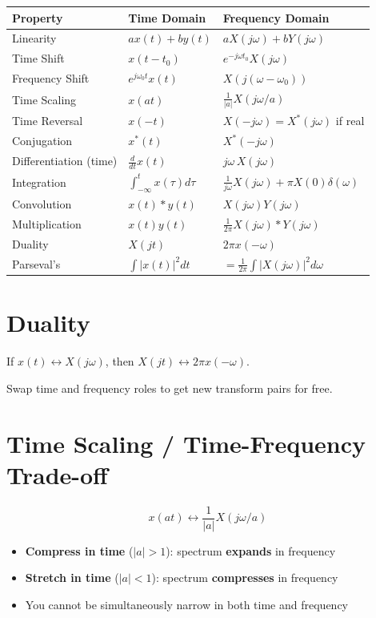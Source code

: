 \documentclass[11pt]{article}
\begin{document}
\begin{center}
\begin{tabular}{|l|l|l|}
\hline
\textbf{Property} & \textbf{Time Domain} & \textbf{Frequency Domain} \\
\hline
Linearity & $ax(t) + by(t)$ & $aX(j\omega) + bY(j\omega)$ \\
\hline
Time Shift & $x(t - t_0)$ & $e^{-j\omega t_0} X(j\omega)$ \\
\hline
Frequency Shift & $e^{j\omega_0 t} x(t)$ & $X(j(\omega - \omega_0))$ \\
\hline
Time Scaling & $x(at)$ & $\frac{1}{|a|} X(j\omega/a)$ \\
\hline
Time Reversal & $x(-t)$ & $X(-j\omega) = X^*(j\omega)$ if real \\
\hline
Conjugation & $x^*(t)$ & $X^*(-j\omega)$ \\
\hline
Differentiation (time) & $\frac{d}{dt}x(t)$ & $j\omega \, X(j\omega)$ \\
\hline
Integration & $\int_{-\infty}^{t} x(\tau)d\tau$ & $\frac{1}{j\omega}X(j\omega) + \pi X(0)\delta(\omega)$ \\
\hline
Convolution & $x(t) * y(t)$ & $X(j\omega) Y(j\omega)$ \\
\hline
Multiplication & $x(t) y(t)$ & $\frac{1}{2\pi} X(j\omega) * Y(j\omega)$ \\
\hline
Duality & $X(jt)$ & $2\pi x(-\omega)$ \\
\hline
Parseval's & $\int|x(t)|^2 dt$ & $= \frac{1}{2\pi}\int|X(j\omega)|^2 d\omega$ \\
\hline
\end{tabular}
\end{center}

\section*{Duality}

If $x(t) \longleftrightarrow X(j\omega)$, then $X(jt) \longleftrightarrow 2\pi x(-\omega)$.

Swap time and frequency roles to get new transform pairs for free.

\section*{Time Scaling / Time-Frequency Trade-off}

\[x(at) \longleftrightarrow \frac{1}{|a|} X(j\omega/a)\]

\begin{itemize}
  \item \textbf{Compress in time} ($|a| > 1$): spectrum \textbf{expands} in frequency
  \item \textbf{Stretch in time} ($|a| < 1$): spectrum \textbf{compresses} in frequency
  \item You cannot be simultaneously narrow in both time and frequency
\end{itemize}
\end{document}
